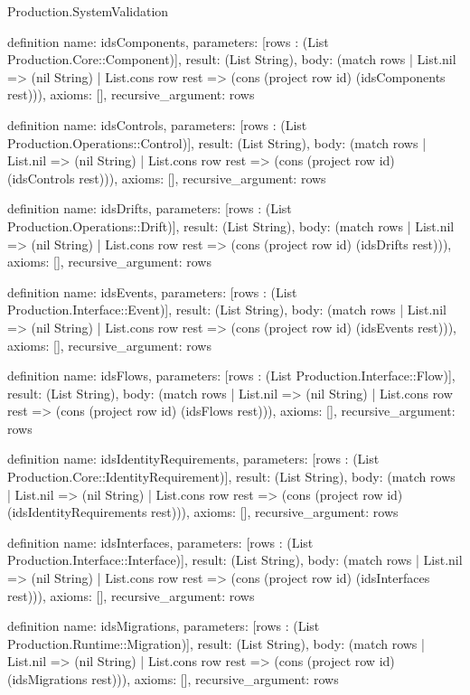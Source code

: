 \begin{lexlean}{Production.SystemValidation}
\begin{semanticmodule}
definition{
  name: idsComponents,
  parameters: [rows : (List Production.Core::Component)],
  result: (List String),
  body: (match rows
    | List.nil => (nil String)
    | List.cons row rest => (cons (project row id) (idsComponents rest))),
  axioms: [],
  recursive_argument: rows
}

definition{
  name: idsControls,
  parameters: [rows : (List Production.Operations::Control)],
  result: (List String),
  body: (match rows
    | List.nil => (nil String)
    | List.cons row rest => (cons (project row id) (idsControls rest))),
  axioms: [],
  recursive_argument: rows
}

definition{
  name: idsDrifts,
  parameters: [rows : (List Production.Operations::Drift)],
  result: (List String),
  body: (match rows
    | List.nil => (nil String)
    | List.cons row rest => (cons (project row id) (idsDrifts rest))),
  axioms: [],
  recursive_argument: rows
}

definition{
  name: idsEvents,
  parameters: [rows : (List Production.Interface::Event)],
  result: (List String),
  body: (match rows
    | List.nil => (nil String)
    | List.cons row rest => (cons (project row id) (idsEvents rest))),
  axioms: [],
  recursive_argument: rows
}

definition{
  name: idsFlows,
  parameters: [rows : (List Production.Interface::Flow)],
  result: (List String),
  body: (match rows
    | List.nil => (nil String)
    | List.cons row rest => (cons (project row id) (idsFlows rest))),
  axioms: [],
  recursive_argument: rows
}

definition{
  name: idsIdentityRequirements,
  parameters: [rows : (List Production.Core::IdentityRequirement)],
  result: (List String),
  body: (match rows
    | List.nil => (nil String)
    | List.cons row rest => (cons (project row id) (idsIdentityRequirements rest))),
  axioms: [],
  recursive_argument: rows
}

definition{
  name: idsInterfaces,
  parameters: [rows : (List Production.Interface::Interface)],
  result: (List String),
  body: (match rows
    | List.nil => (nil String)
    | List.cons row rest => (cons (project row id) (idsInterfaces rest))),
  axioms: [],
  recursive_argument: rows
}

definition{
  name: idsMigrations,
  parameters: [rows : (List Production.Runtime::Migration)],
  result: (List String),
  body: (match rows
    | List.nil => (nil String)
    | List.cons row rest => (cons (project row id) (idsMigrations rest))),
  axioms: [],
  recursive_argument: rows
}


\end{semanticmodule}
\end{lexlean}
